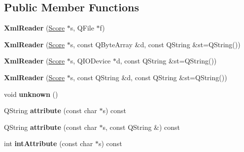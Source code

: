 \subsection*{Public Member Functions}
\begin{DoxyCompactItemize}
\item 
\mbox{\label{class_ms_1_1_xml_reader_a56419248ca27f295953a2156d1011174}} 
{\bfseries Xml\+Reader} (\hyperlink{class_ms_1_1_score}{Score} $\ast$s, Q\+File $\ast$f)
\item 
\mbox{\label{class_ms_1_1_xml_reader_a81f897dd1d7fbf6cfa0d733716e82f54}} 
{\bfseries Xml\+Reader} (\hyperlink{class_ms_1_1_score}{Score} $\ast$s, const Q\+Byte\+Array \&d, const Q\+String \&st=Q\+String())
\item 
\mbox{\label{class_ms_1_1_xml_reader_a5ffd9195a44dc3b1b80b169a96d68624}} 
{\bfseries Xml\+Reader} (\hyperlink{class_ms_1_1_score}{Score} $\ast$s, Q\+I\+O\+Device $\ast$d, const Q\+String \&st=Q\+String())
\item 
\mbox{\label{class_ms_1_1_xml_reader_a7adc9286a45571cdcb010113c14531c2}} 
{\bfseries Xml\+Reader} (\hyperlink{class_ms_1_1_score}{Score} $\ast$s, const Q\+String \&d, const Q\+String \&st=Q\+String())
\item 
\mbox{\label{class_ms_1_1_xml_reader_a7711a261ee2243237d7f055c99bc1d96}} 
void {\bfseries unknown} ()
\item 
\mbox{\label{class_ms_1_1_xml_reader_ad0b7f9095ed1301cb1d1f2a46f4da5a5}} 
Q\+String {\bfseries attribute} (const char $\ast$s) const
\item 
\mbox{\label{class_ms_1_1_xml_reader_a282721b1851fc18afde59752fe9a73a4}} 
Q\+String {\bfseries attribute} (const char $\ast$s, const Q\+String \&) const
\item 
\mbox{\label{class_ms_1_1_xml_reader_a714c3bb9180f54b8ee9ca73d1ce3187a}} 
int {\bfseries int\+Attribute} (const char $\ast$s) const
\item 
\mbox{\label{class_ms_1_1_xml_reader_a78a5181d5eea84ea7df6b0c0a13ddfba}} 

\end{DoxyCompactItemize}
